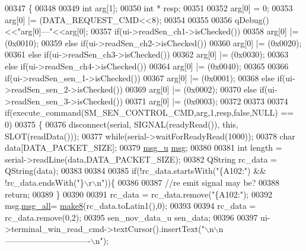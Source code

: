 \begin{DoxyCode}
00347 \{
00348 
00349     \textcolor{keywordtype}{int} arg[1];
00350     \textcolor{keywordtype}{int} * resp;
00351 
00352    arg[0] = 0;
00353    arg[0] |= (DATA\_REQUEST\_CMD<<8);
00354 
00355 
00356    qDebug()<<\textcolor{stringliteral}{"arg[0]---"}<<arg[0];
00357    \textcolor{keywordflow}{if}(ui->readSen\_ch1->isChecked())
00358    arg[0] |= (0x0010);
00359    \textcolor{keywordflow}{else} \textcolor{keywordflow}{if}(ui->readSen\_ch2->isChecked())
00360    arg[0] |= (0x0020);
00361    \textcolor{keywordflow}{else} \textcolor{keywordflow}{if}(ui->readSen\_ch3->isChecked())
00362    arg[0] |= (0x0030);
00363    \textcolor{keywordflow}{else} \textcolor{keywordflow}{if}(ui->readSen\_ch4->isChecked())
00364    arg[0] |= (0x0040);
00365 
00366    \textcolor{keywordflow}{if}(ui->readSen\_sen\_1->isChecked())
00367    arg[0] |= (0x0001);
00368    \textcolor{keywordflow}{else} \textcolor{keywordflow}{if}(ui->readSen\_sen\_2->isChecked())
00369    arg[0] |= (0x0002);
00370    \textcolor{keywordflow}{else} \textcolor{keywordflow}{if}(ui->readSen\_sen\_3->isChecked())
00371    arg[0] |= (0x0003);
00372 
00373 
00374     \textcolor{keywordflow}{if}(execute\_command(SM\_SEN\_CONTROL\_CMD,arg,1,resp,\textcolor{keyword}{false},NULL) == 0)
00375     \{
00376       disconnect(serial, SIGNAL(readyRead()), \textcolor{keyword}{this}, SLOT(readData()));
00377       \textcolor{keywordflow}{while}(serial->waitForReadyRead(1000));
00378       \textcolor{keywordtype}{char} data[DATA\_PACKET\_SIZE];
00379       \hyperlink{a00001_da/d2a/a00086}{msg\_u} \hyperlink{a00006_a6134b74dbfffbaf333e169bd09597b53}{msg};
00380 
00381       \textcolor{keywordtype}{int} length = serial->readLine(data,DATA\_PACKET\_SIZE);
00382       QString rc\_data = QString(data);
00383 
00384 
00385       \textcolor{keywordflow}{if}(!rc\_data.startsWith(\textcolor{stringliteral}{"\{A102:"}) && !rc\_data.endsWith(\textcolor{stringliteral}{"\}\(\backslash\)r\(\backslash\)n"}))\{
00386 
00387           \textcolor{comment}{//re emit signal may be?}
00388           \textcolor{keywordflow}{return};
00389       \}
00390 
00391       rc\_data = rc\_data.remove(\textcolor{stringliteral}{"\{A102:"});
00392       msg.\hyperlink{a00001_a2763c4336b9376a5385ff279ba0a6591}{msg\_all}= \hyperlink{a00006_aebce94d5e6af7afff661daf74b208de1}{make8}(rc\_data.toLatin1(),0);
00393 
00394       rc\_data = rc\_data.remove(0,2);
00395       sen\_nov\_data\_u sen\_data;
00396 
00397        ui->terminal\_win\_read\_cmd->textCursor().insertText(\textcolor{stringliteral}{"\(\backslash\)n\(\backslash\)n-------------------------------\(\backslash\)n"});

\end{DoxyCode}

